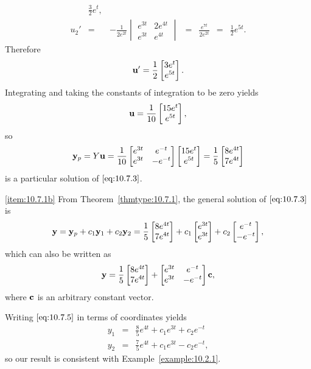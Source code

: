 \documentclass{ximera}
\begin{document}
\begin{example}
\begin{explanation}
$$\begin{array}{ccccccl}
&\frac{3}{2}e^t,\\
u_2'&=&-\frac{1}{2e^{2t}}
\begin{vmatrix}e^{3t}&2e^{4t}\\e^{3t}&e^{4t}
\end{vmatrix}&=&\frac{e^{7t}}{2e^{2t}}&=&\frac{1}{2}e^{5t}.
\end{array}
$$
 Therefore
$$
{\bf
u}'=\frac{1}{2}\begin{bmatrix}3e^t\\e^{5t}\end{bmatrix}.
$$
Integrating and taking the constants of integration to be zero yields
$$
{\bf
u}=\frac{1}{10}\begin{bmatrix}15e^t\\e^{5t}\end{bmatrix},
$$
so
$$
{\bf y}_p=Y{\bf u}=
\frac{1}{10}\begin{bmatrix}e^{3t}&e^{-t}\\
e^{3t}&-e^{-t}\end{bmatrix}
\begin{bmatrix}15e^t\\e^{5t}\end{bmatrix}
=\frac{1}{5}\begin{bmatrix}8e^{4t}\\7e^{4t}\end{bmatrix}
$$
is a particular solution of  $\eqref{eq:10.7.3}$.


\ref{item:10.7.1b} From Theorem~\ref{thmtype:10.7.1}, the general solution of
$\eqref{eq:10.7.3}$ is
\begin{equation} \label{eq:10.7.5}
{\bf y}={\bf y}_p+c_1{\bf y}_1+c_2{\bf y}_2=
\frac{1}{5}\begin{bmatrix}8e^{4t}\\7e^{4t}\end{bmatrix}
+c_1\begin{bmatrix}e^{3t}\\e^{3t}\end{bmatrix}
+c_2\begin{bmatrix}e^{-t}\\-e^{-t}\end{bmatrix},
\end{equation}
which can also be written as
$$
{\bf y}=
\frac{1}{5}\begin{bmatrix}8e^{4t}\\7e^{4t}\end{bmatrix}
+\begin{bmatrix}e^{3t}&e^{-t}\\e^{3t}&-e^{-t}\end{bmatrix}{\bf c},
$$
where ${\bf c}$ is an arbitrary constant vector.

Writing $\eqref{eq:10.7.5}$ in terms of
coordinates yields
\begin{eqnarray*}
y_1&=&\frac{8}{5}e^{4t}+c_1e^{3t}+c_2e^{-t}\\
y_2&=&\frac{7}{5}e^{4t}+c_1e^{3t}-c_2e^{-t},
\end{eqnarray*}
so our result is consistent with Example~\ref{example:10.2.1}.
\end{explanation}
\end{example}
\end{document}
